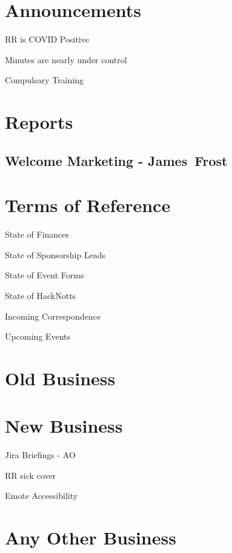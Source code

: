 \documentclass[11pt,hacksoc,agenda]{meetingmins}
\begin{document}
\maketitle

\section{Announcements}
\begin{items}
\item RR is COVID Positive
\item Minutes are nearly under control
\item Compulsary Training
\end{items}

\section{Reports}
\subsection{Welcome Marketing - James~Frost}
\begin{hiddensubitems}
\item
\end{hiddensubitems}

\section{Terms of Reference}
\begin{items}
\item {State of Finances}
\item {State of Sponsorship Leads}
\item {State of Event Forms}
\item {State of HackNotts}
\item {Incoming Correspondence}
\item {Upcoming Events}
\end{items}

\section{Old Business}

\section{New Business}
\begin{items}
\item Jira Briefings - AO
\item RR sick cover
\item Emote Accessibility
\end{items}

\section{Any Other Business}

\vspace{1em}
\end{document}
